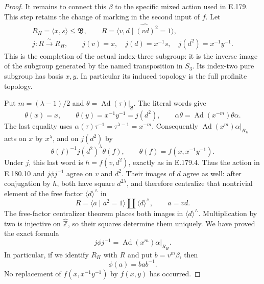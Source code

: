 \begin{proof}
It remains to connect this \(\beta\) to the specific
mixed action used in E.179.  This step retains the
change of marking in the second input of \(f\).
Let
\[
 \begin{gathered}
 R_H=\langle x,s\rangle\leq\mathfrak B,\qquad
 R=\widehat{\langle v,d\mid(vd)^2=1\rangle},\\
 j:R\xrightarrow{\;\sim\;}R_H,\qquad
 j(v)=x,\quad j(d)=x^{-1}s,\quad
 j(d^2)=x^{-1}y^{-1}.
 \end{gathered}
\tag{E.180.8}
\]
This is the completion of the actual index-three
subgroup: it is the inverse image of the subgroup
generated by the named transposition in \(S_3\).
Its index-two pure subgroup has basis \(x,y\).
In particular its induced topology is the full
profinite topology.

Put \(m=(\lambda-1)/2\) and
\(\theta=\operatorname{Ad}(\tau)|_{\mathfrak F}\).
The literal words give
\[
 \theta(x)=x,\qquad
 \theta(y)=x^{-1}y^{-1}=j(d^2),\qquad
 \alpha\theta=\operatorname{Ad}(x^{-m})\theta\alpha.
\tag{E.180.9}
\]
The last equality uses
\(\alpha(\tau)\tau^{-1}=\tau^{\lambda-1}=x^{-m}\).
Consequently \(\operatorname{Ad}(x^m)\alpha|_{R_H}\)
acts on \(x\) by \(x^\lambda\), and on \(j(d^2)\)
by
\[
 \theta(f)^{-1}j(d^2)^\lambda\theta(f),\qquad
                 \theta(f)=f(x,x^{-1}y^{-1}).
\tag{E.180.10}
\]
Under \(j\), this last word is
\(h=f(v,d^2)\), exactly as in E.179.4.
Thus the action in E.180.10 and \(j\phi j^{-1}\)
agree on \(v\) and \(d^2\).
Their images of \(d\) agree as well: after conjugation
by \(h\), both have square \(d^{2\lambda}\), and
therefore centralize that nontrivial element of
the free factor \(\langle d\rangle^\wedge\) in
\[
                  R=\langle a\mid a^2=1\rangle
                            \amalg\langle d\rangle^\wedge,
                   \qquad a=vd .
\]
The free-factor centralizer theorem places both
images in \(\langle d\rangle^\wedge\).
Multiplication by two is injective on
\(\widehat{\mathbb Z}\), so their squares determine
them uniquely.  We have proved the exact formula
\[
             j\phi j^{-1}
                  =\operatorname{Ad}(x^m)\alpha|_{R_H}.
\tag{E.180.11}
\]
In particular, if we identify \(R_H\) with \(R\)
and put \(b=v^m\beta\), then
\[
                             \phi(a)=bab^{-1}.
\tag{E.180.12}
\]
No replacement of \(f(x,x^{-1}y^{-1})\) by \(f(x,y)\)
has occurred.


\end{proof}
